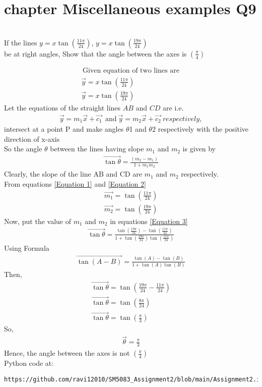 \documentclass[journal,12pt,twocolumn]{IEEEtran}
\begin{document}
\section{ chapter   Miscellaneous examples  Q9}
\item \\If the lines 
$y=x \tan (\frac{11\pi}{24})$,  $y=x \tan (\frac{19\pi}{24})$ \\be at right angles, Show that the angle between the axes is $(\frac{\pi}{4})$ 

\solution
\begin{align}
    ~\text{Given equation of two lines are}~\\ 
    \label{Equation 1}
    \vec{y} = x \tan (\frac{11\pi}{24})\\
    \label{Equation 2}
    \vec{y} = x \tan (\frac{19\pi}{24})
\end{align}
Let the equations of the straight lines $AB$ and $CD$ are i.e.
\begin{align}
    \vec{y} = m_1  \vec{x} + \vec{c_1} \ ~\text{and}~
    \vec{y} = m_2  \vec{x} + \vec{c_2} \
{respectively,}
\end{align}
intersect at a point P and make angles $\theta$1 and $\theta$2 respectively with the positive direction of x-axis\\
So the angle $\theta$ between the lines having slope $m_1$ and $m_2$ is given by
\begin{align}
\label{Equation 3}
\vec{\tan\theta} = \frac{(m_2 - m_1)}{1 + m_1m_2}
\end{align}
Clearly, the slope of the line AB and CD are $m_1$ and $m_2$ respectively.\\
From equations  
    \eqref{Equation 1} and \eqref{Equation 2}
\begin{align}
    \vec{m_1} =  \tan (\frac{11\pi}{24})\\
    \vec{m_2} =  \tan (\frac{19\pi}{24})
\end{align}
Now, put the value of $m_1$ and $m_2$ in equations  
    \eqref{Equation 3}
\begin{align}
 \vec{\tan\theta} = \frac{\tan (\frac{19\pi}{24}) -\tan (\frac{11\pi}{24})}{1 + \tan (\frac{19\pi}{24})\tan (\frac{11\pi}{24})}
\end{align}
Using Formula 
\begin{align}
 \vec{\tan(A-B)} = \frac{\tan (A) -\tan (B)}{1 + \tan (A)\tan (B)}
\end{align}
Then,
\begin{align}
 \vec{\tan\theta} = {\tan (\frac{19\pi}{24}-\frac{11\pi}{24})}\\
 \vec{\tan\theta} = {\tan (\frac{8\pi}{24})}\\
 \vec{\tan\theta} = {\tan (\frac{\pi}{3})}
\end{align}
 So,
 \begin{align}
 \vec{\theta} = { \frac{\pi}{3}}
\end{align}
Hence, the angle between the axes is not $(\frac{\pi}{4})$
\newline \\Python code at:
\begin{lstlisting}
https://github.com/ravi12010/SM5083_Assignment2/blob/main/Assignment2.ipynb
\end{lstlisting}
\end{document}
